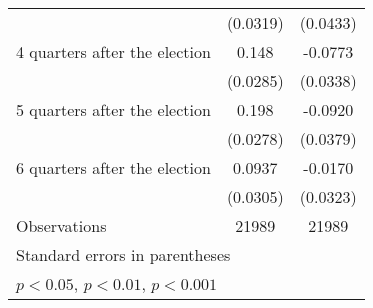 \begin{table}[htbp]
\begin{tabular}{l*{2}{c}}
                    &    (0.0319)         &    (0.0433)         \\
[1em]
 4 quarters after the election&       0.148\sym{***}&     -0.0773\sym{*}  \\
                    &    (0.0285)         &    (0.0338)         \\
[1em]
 5 quarters after the election&       0.198\sym{***}&     -0.0920\sym{*}  \\
                    &    (0.0278)         &    (0.0379)         \\
[1em]
 6 quarters after the election&      0.0937\sym{**} &     -0.0170         \\
                    &    (0.0305)         &    (0.0323)         \\
\hline
Observations        &       21989         &       21989         \\
\hline\hline
\multicolumn{3}{l}{\footnotesize Standard errors in parentheses}\\
\multicolumn{3}{l}{\footnotesize \sym{*} \(p<0.05\), \sym{**} \(p<0.01\), \sym{***} \(p<0.001\)}\\
\end{tabular}
\end{table}

